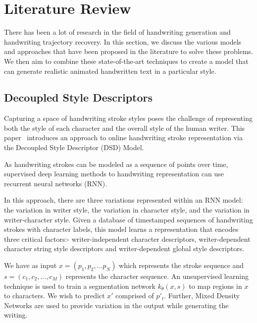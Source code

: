 \documentclass[10pt,twocolumn,letterpaper]{article}
\begin{document}
\section{Literature Review}
\label{sec: Lit Rev}
There has been a lot of research in the field of handwriting generation and handwriting trajectory recovery. In this section, we discuss the various models and approaches that have been proposed in the literature to solve these problems. We then aim to combine these state-of-the-art techniques to create a model that can generate realistic animated handwritten text in a particular style.

\subsection{Decoupled Style Descriptors} 
\label{subsec: Brush Paper}
 Capturing a space of handwriting stroke styles poses the challenge of representing both the style of each character and the overall style of the human writer.
This paper~\cite{BRUSH-paper} introduces an approach to online handwriting stroke representation via the Decoupled Style Descriptor (DSD) Model. 

As handwriting strokes can be modeled as  a sequence of points over time, supervised deep learning methods to handwriting representation can use recurrent neural networks (RNN).

In this approach, there are three variations represented within an RNN model: the variation in writer style, the variation in character style, and the variation in writer-character style. Given a database of timestamped sequences of handwriting strokes with character labels, this model learns a representation that encodes three critical factors:- writer-independent character descriptors, writer-dependent character string style descriptors and writer-dependent global style descriptors.

We have as input $x = (p_1, p_2, ... p_N)$ which represents the stroke sequence and $s = (c_1, c_2, ..., c_M)$ represents the character sequence. An unsupervised learning technique is used to train a segmentation network $k_{\theta}(x,s)$ to map regions in $x$ to characters.
 We wish to predict $x'$ comprised of $p'_t$.  Further, Mixed Density Networks are used to provide variation in the output while generating the writing.
\end{document}

